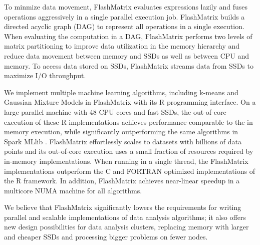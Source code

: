 To minmize data movement, FlashMatrix evaluates expressions lazily and fuses
operations aggressively in a single parallel execution job.
FlashMatrix builds a directed acyclic graph (DAG) to represent all operations
in a single execution. When evaluating the computation in a DAG, FlashMatrix
performs two levels of matrix partitioning to improve data utilization in
the memory hierarchy and reduce data movement between memory and SSDs
as well as between CPU and memory. To access data stored on SSDs, FlashMatrix
streams data from SSDs to maximize I/O throughput.  






We implement multiple machine learning algorithms, including k-means \cite{kmeans}
and Gaussian Mixture Models \cite{gmm} in FlashMatrix with its R programming
interface. On a large parallel machine with 48
CPU cores and fast SSDs, the out-of-core execution of these R implementations
achieves performance comparable to the in-memory execution,
while significantly outperforming the same algorithms in Spark MLlib
\cite{spark}. FlashMatrix effortlessly scales to datasets with billions
of data points and its out-of-core execution uses a small fraction of
resources required by in-memory implementations. When
running in a single thread, the FlashMatrix implementations
outperform the C and FORTRAN optimized implementations of the R framework.
In addition, FlashMatrix achieves near-linear speedup in a multicore NUMA
machine for all algorithms. 

We believe that FlashMatrix significantly lowers the requirements for writing parallel
and scalable implementations of data analysis algorithms; it also offers new
design possibilities for data analysis clusters, replacing memory with larger
and cheaper SSDs and processing bigger problems on fewer nodes.
